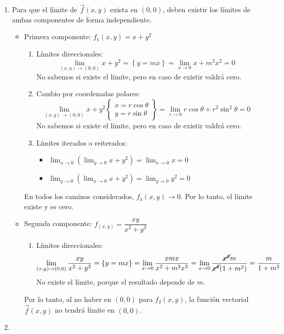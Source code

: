 \begin{enumerate}[label=\color{red}\textbf{\arabic*)}, leftmargin=*]
\begin{enumerate}[label=\arabic*)]
\end{enumerate}
\item {}
Para que el límite de $\vec{f}(x,y)$ exista en $(0,0)$, deben existir los límites de ambas componentes de forma independiente.
\begin{itemize}
\item Primera componente: $f_1(x,y)=x+y^2$
\begin{enumerate}[label=\arabic*)]
\item Límites direccionales: $$\lim_{(x,y)\to(0,0)}x+y^2=\left\{y=mx\right\}=\lim_{x\to0}x+m^2x^2=0$$No sabemos si existe el límite, pero en caso de existir valdrá cero.
\item Cambio por coordenadas polares: $$\lim_{(x,y)\to(0,0)}x+y^2\left\{\begin{array}{l}x=r\cos\theta\\ y=r\sin\theta\end{array}\right\}=\lim_{r\to0}r\cos\theta+r^2\sin^2\theta=0$$No sabemos si existe el límite, pero en caso de existir valdrá cero.
\item Límites iterados o reiterados:
\begin{itemize}[label=\textbullet]
\item $\lim_{x\to0}\left(\lim_{y\to0}x+y^2\right)=\lim_{x\to0}x=0$
\item $\lim_{y\to0}\left(\lim_{x\to0}x+y^2\right)=\lim_{y\to0}y^2=0$
\end{itemize}
\end{enumerate}
En todos los caminos considerados, $f_1(x,y)\to0$. Por lo tanto, el límite existe y es cero.
\item Segunda componente: $f_(x,y)=\dfrac{xy}{x^2+y^2}$
\begin{enumerate}[label=\arabic*)]
\item Límites direccionales: $$\lim_{(x,y)\to(0,0)}\dfrac{xy}{x^2+y^2}=\{y=mx\}=\lim_{x\to0}\dfrac{xmx}{x^2+m^2x^2}=\lim_{x\to0}\dfrac{\cancel{x^2}m}{\cancel{x^2}(1+m^2)}=\dfrac{m}{1+m^2}$$
No existe el límite, porque el resultado depende de $m$.
\end{enumerate}
Por lo tanto, al no haber en $(0,0)$ para $f_2(x,y)$, la función vectorial $\vec{f}(x,y)$ no tendrá límite en $(0,0)$.
\end{itemize}
\item {}

\end{enumerate}
